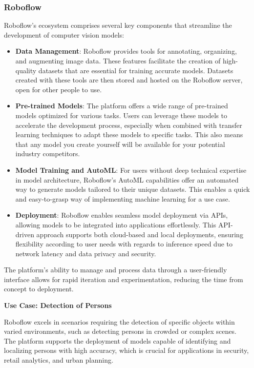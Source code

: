 \subsubsection{Roboflow}
Roboflow's ecosystem comprises several key components that streamline the development of computer vision models:
\begin{itemize}
    \item \textbf{Data Management}: Roboflow provides tools for annotating, organizing, and augmenting image data. These features facilitate the creation of high-quality datasets that are essential for training accurate models. Datasets created with these tools are then stored and hosted on the Roboflow server, open for other people to use.
    \item \textbf{Pre-trained Models}: The platform offers a wide range of pre-trained models optimized for various tasks. Users can leverage these models to accelerate the development process, especially when combined with transfer learning techniques to adapt these models to specific tasks. This also means that any model you create yourself will be available for your potential industry competitors.
    \item \textbf{Model Training and AutoML}: For users without deep technical expertise in model architecture, Roboflow's AutoML capabilities offer an automated way to generate models tailored to their unique datasets. This enables a quick and easy-to-grasp way of implementing machine learning for a use case.
    \item \textbf{Deployment}: Roboflow enables seamless model deployment via APIs, allowing models to be integrated into applications effortlessly. This API-driven approach supports both cloud-based and local deployments, ensuring flexibility according to user needs with regards to inference speed due to network latency and data privacy and security.
\end{itemize}

The platform's ability to manage and process data through a user-friendly interface allows for rapid iteration and experimentation, reducing the time from concept to deployment.

\textbf{Use Case: Detection of Persons}

Roboflow excels in scenarios requiring the detection of specific objects within varied environments, such as detecting persons in crowded or complex scenes. The platform supports the deployment of models capable of identifying and localizing persons with high accuracy, which is crucial for applications in security, retail analytics, and urban planning.

